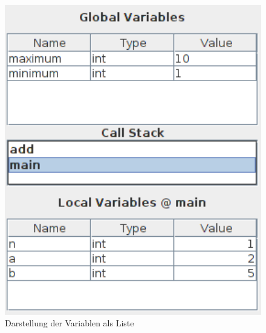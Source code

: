 \begin{figure}[h!]
\centering
	\begin{minipage}{0.50\textwidth}
		\centering
		\includegraphics[width=1.0\textwidth]{./media/images/gui/var/callstack.png}
		\caption{Darstellung der Variablen als Liste}\label{fig:deb-var-m1}
	\end{minipage}\hfill
	\begin{minipage}{0.45\textwidth}
		\centering

\end{minipage}
\end{figure}
